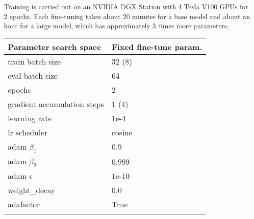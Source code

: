 \documentclass{bioinfo}
\begin{document}
\begin{methods}
Training is carried out on an NVIDIA DGX Station with 4 Tesla V100 GPUs for 2 epochs. Each fine-tuning takes about 20 minutes for a base model and about an hour for a large model, which has approximately 3 times more parameters. 

\begin{table}[]
 {\begin{tabular}{@{}ll@{}}\toprule
Parameter search space           & Fixed fine-tune param.\\\midrule
train batch size                 & 32 (8)               \\
eval batch size                  & 64                   \\
epochs                           & 2                    \\
gradient accumulation steps      & 1 (4)                \\
learning rate                    & 1e-4                 \\
lr scheduler                     & cosine               \\
adam $\beta_1$                   & 0.9                  \\
adam $\beta_2$                   & 0.999                \\
adam $\epsilon$                  & 1e-10                \\
weight\_decay                    & 0.0                  \\
adafactor                        & True                 \\\botrule
\end{tabular}
}{}
\end{table}


\end{methods}
\end{document}

